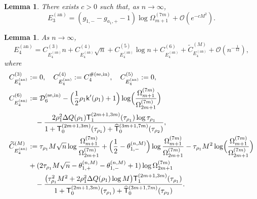 \documentclass[a4paper]{article}
\newtheorem{lemma}[theorem]{Lemma}
\numberwithin{equation}{section}
\begin{document}
\begin{lemma}\label{lemma:asymptotic expansion E3 annulus}
There exists $c>0$ such that, as $n\to\infty$,
\[
E_{3}^{(\mathrm{an})}=(g_{1,-}-g_{a_1,+}-1)\log\Omega_{m+1}^{(7m)}+\mathcal{O}(e^{-cM^2}). 
\]

\end{lemma}


\begin{lemma}\label{lemma:asymptotic expansion E4 annulus}
As $n\to\infty$,
\[
 E_4^{(\mathrm{an})}
 =
 C_{E_4^{(\mathrm{an})}}^{(3)}n 
 +C_{E_4^{(\mathrm{an})}}^{(4)}\sqrt{n}
 +C_{E_4^{(\mathrm{an})}}^{(5)}\log n
 +C_{E_4^{(\mathrm{an})}}^{(6)}
 +\widetilde{C}_{E_4^{(\mathrm{an})}}^{(M)}
 +\mathcal{O}(n^{-\frac{1}{12}}),
\]   
where 
\begin{align*}
C_{E_4^{(\mathrm{an})}}^{(3)}&:=0,
\quad
C_{E_4^{(\mathrm{an})}}^{(4)}:=C_4^{\#(\mathrm{se,in})},
\quad
C_{E_4^{(\mathrm{an})}}^{(5)}:=0, 
\\
C_{E_4^{(\mathrm{an})}}^{(6)}&:=
\mathcal{D}_6^{(\mathrm{se},\mathrm{in})}
-\Bigl(\frac{1}{2}\rho_1\mathsf{k}'(\rho_1)+1\Bigr)\log\Bigl(\frac{\Omega_{m+1}^{(7m)}}{\Omega_{2m+1}^{(7m)}}\Bigr) 
\\
&\quad-
\frac{2\rho_1^2\Delta Q(\rho_1)\mathsf{T}_{1}^{(2m+1,3m)}(\tau_{\rho_1})\log \tau_{\rho_1}}{1+\mathsf{T}_{0}^{(2m+1,3m)}(\tau_{\rho_1})+\widehat{\mathsf{T}}_{0}^{(3m+1,7m)}(\tau_{\rho_2})},
\\
\widetilde{C}_{E_4^{(\mathrm{an})}}^{(M)}
&:=
\tau_{\rho_1}M\sqrt{n}
\log\frac{\Omega_{m+1}^{(7m)}}{\Omega_{2m+1}^{(7m)}}
+\Bigl(\frac{1}{2}-\theta_{1,-}^{(n,M)}\Bigr)\log\frac{\Omega_{m+1}^{(7m)}}{\Omega_{2m+1}^{(7m)}}
-\tau_{\rho_1}M^2\log\Bigl(\frac{\Omega_{m+1}^{(7m)}}{\Omega_{2m+1}^{(7m)}}\Bigr)
\\
&
+(2\tau_{\rho_1}M\sqrt{n}-\theta_{1,+}^{(n,M)}-\theta_{1,-}^{(n,M)}+1)\log\Omega_{2m+1}^{(7m)}
\\
&\quad-
\frac{\big(\tau_{\rho_1}^2M^2
+2\rho_1^2\Delta Q(\rho_1)\log M
\big)\mathsf{T}_{1}^{(2m+1,3m)}(\tau_{\rho_1})}{1+\mathsf{T}_{0}^{(2m+1,3m)}(\tau_{\rho_1})+\widehat{\mathsf{T}}_{0}^{(3m+1,7m)}(\tau_{\rho_2})}.
\end{align*}
\end{lemma}
\end{document}
